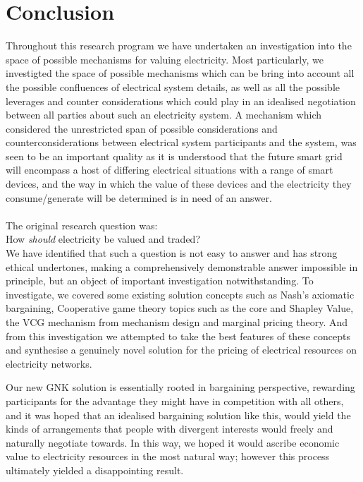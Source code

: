 \chapter{Conclusion}
\label{cha:conc}

Throughout this research program we have undertaken an investigation into the space of possible mechanisms for valuing electricity.
Most particularly, we investigted the space of possible mechanisms which can be bring into account all the possible confluences of electrical system details, as well as all the possible leverages and counter considerations which could play in an idealised negotiation between all parties about such an electricity system.
A mechanism which considered the unrestricted span of possible considerations and counterconsiderations between electrical system participants and the system, was seen to be an important quality as it is understood that the future smart grid will encompass a host of differing electrical situations with a range of smart devices, and the way in which the value of these devices and the electricity they consume/generate will be determined is in need of an answer.\\
\\\noindent
The original research question was:\\
\-\hspace{1cm}How \textit{should} electricity be valued and traded?\\

We have identified that such a question is not easy to answer and has strong ethical undertones, making a comprehensively demonstrable answer impossible in principle, but an object of important investigation notwithstanding.
To investigate, we covered some existing solution concepts such as Nash's axiomatic bargaining, Cooperative game theory topics such as the core and Shapley Value, the VCG mechanism from mechanism design and marginal pricing theory.
And from this investigation we attempted to take the best features of these concepts and synthesise a genuinely novel solution for the pricing of electrical resources on electricity networks.

Our new GNK solution is essentially rooted in bargaining perspective, rewarding participants for the advantage they might have in competition with all others, 
and it was hoped that an idealised bargaining solution like this, would yield the kinds of arrangements that people with divergent interests would freely and naturally negotiate towards.
In this way, we hoped it would ascribe economic value to electricity resources in the most natural way; however this process ultimately yielded a disappointing result.

